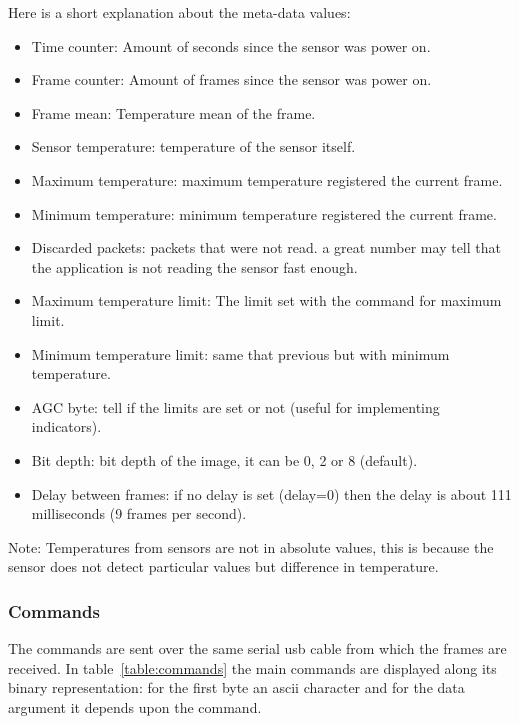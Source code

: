 \documentclass[hidelinks,11pt,a4paper,oneside,article]{memoir}
\begin{document}
Here is a short explanation about the meta-data values:
\begin{itemize}
    \item Time counter: Amount of seconds since the sensor was power on.
    \item Frame counter: Amount of frames since the sensor was power on.
    \item Frame mean: Temperature mean of the frame.
    \item Sensor temperature: temperature of the sensor itself.
    \item Maximum temperature: maximum temperature registered the current frame.
    \item Minimum temperature: minimum temperature registered the current frame.
    \item Discarded packets: packets that were not read. a great number may tell that the application is not reading the sensor fast enough.
    \item Maximum temperature limit: The limit set with the command for maximum limit.
    \item Minimum temperature limit: same that previous but with minimum temperature.
    \item AGC byte: tell if the limits are set or not (useful for implementing indicators).
    \item Bit depth: bit depth of the image, it can be 0, 2 or 8 (default).
    \item Delay between frames: if no delay is set (delay=0) then the delay is about 111 milliseconds (9 frames per second).
\end{itemize}
Note: Temperatures from sensors are not in absolute values, this is because the sensor does not detect particular values but difference in temperature.

\subsubsection{Commands} \label{commands}
The commands are sent over the same serial \gls{usb} cable from which the frames are received. In table~\ref{table:commands} the main commands are displayed along its binary representation: for the first byte an \gls{ascii} character and for the data argument it depends upon the command.
\end{document}

